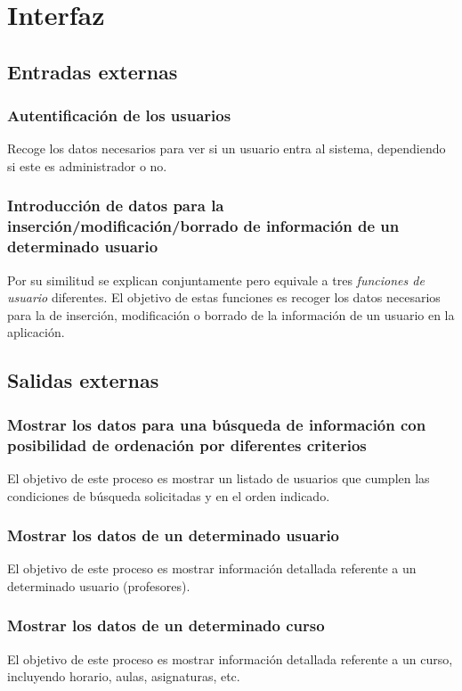 \documentclass[11pt,a4paper,spanish,twoside]{book}
\begin{document}
\section{Interfaz}
\subsection{Entradas externas}
\subsubsection{Autentificación de los usuarios}
Recoge los datos necesarios para ver si un usuario entra al sistema,
dependiendo si este es administrador o no.

\subsubsection{Introducción de datos para la inserción/modificación/borrado 
de información de un determinado usuario}
Por su similitud se explican conjuntamente pero equivale a tres
\emph{funciones de usuario} diferentes. El objetivo de estas funciones es
recoger los datos necesarios para la de inserción, modificación o borrado de
la información de un usuario en la aplicación.

\subsection{Salidas externas}
\subsubsection{Mostrar los datos para una búsqueda de información con
  posibilidad de ordenación por diferentes criterios}
El objetivo de este proceso es mostrar un listado de usuarios que cumplen las
condiciones de búsqueda solicitadas y en el orden indicado.

\subsubsection{Mostrar los datos de un determinado usuario}
El objetivo de este proceso es mostrar información detallada referente a un
determinado usuario (profesores).

\subsubsection{Mostrar los datos de un determinado curso}
El objetivo de este proceso es mostrar información detallada referente a un
curso, incluyendo horario, aulas, asignaturas, etc.
\end{document}
